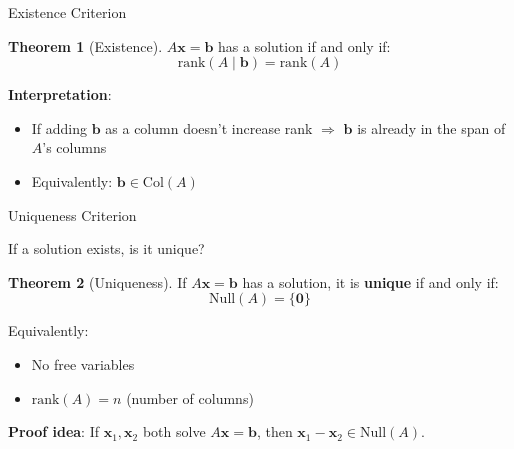 \documentclass[10pt]{beamer}
\theoremstyle{definition}
\newtheorem{thm}{Theorem}[section]
\newcommand{\x}[1]{\alert{\textbf{#1}}}
\begin{document}
\begin{frame}{Existence Criterion}

\begin{thm}[Existence]
$A\mathbf{x} = \mathbf{b}$ has a solution if and only if:
$$\text{rank}(A \mid \mathbf{b}) = \text{rank}(A)$$
\end{thm}

\vspace{1em}

\x{Interpretation}:
\begin{itemize}
\item If adding $\mathbf{b}$ as a column doesn't increase rank $\Rightarrow$ $\mathbf{b}$ is already in the span of $A$'s columns
\item Equivalently: $\mathbf{b} \in \text{Col}(A)$
\end{itemize}

\end{frame}

\begin{frame}{Uniqueness Criterion}

If a solution exists, is it unique?

\vspace{1em}

\begin{thm}[Uniqueness]
If $A\mathbf{x} = \mathbf{b}$ has a solution, it is \x{unique} if and only if:
$$\text{Null}(A) = \{\mathbf{0}\}$$

Equivalently:
\begin{itemize}
\item No free variables
\item $\text{rank}(A) = n$ (number of columns)
\end{itemize}
\end{thm}

\vspace{1em}

\x{Proof idea}: If $\mathbf{x}_1, \mathbf{x}_2$ both solve $A\mathbf{x}=\mathbf{b}$, then $\mathbf{x}_1 - \mathbf{x}_2 \in \text{Null}(A)$.

\end{frame}
\end{document}
